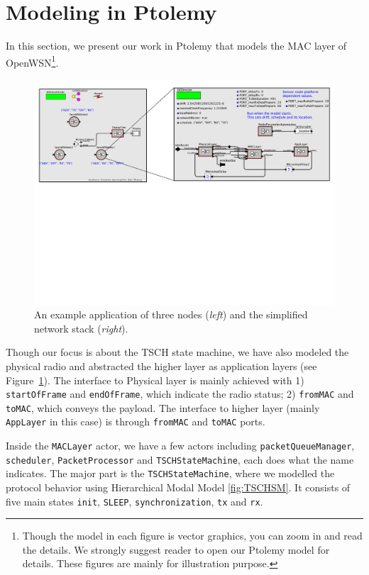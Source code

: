 
\section{Modeling in Ptolemy}
\label{sec:modeling-ptolemy}

In this section, we present our work in Ptolemy that models the MAC layer of OpenWSN\footnote{Though the model in each figure is vector graphics, you can zoom in and read the details. We strongly suggest reader to open our Ptolemy model for details. These figures are mainly for illustration purpose.}.

\begin{figure}[t]
\centering
\includegraphics[width=1\columnwidth]{figures/PaperOpenWSNNode}
\caption{An example application of three nodes ({\em left}) and the simplified network stack ({\em right}).}
\label{fig:OpenWSNNode}
\end{figure}

Though our focus is about the TSCH state machine, we have also modeled the physical radio and abstracted the higher layer as application layers (see Figure~\ref{fig:OpenWSNNode}). The interface to Physical layer is mainly achieved with 1) \texttt{startOfFrame} and \texttt{endOfFrame}, which indicate the radio status; 2) \texttt{fromMAC} and \texttt{toMAC}, which conveys the payload. The interface to higher layer (mainly \texttt{AppLayer} in this case) is through \texttt{fromMAC} and \texttt{toMAC} ports. 

Inside the \texttt{MACLayer} actor, we have a few actors including \texttt{packetQueueManager}, \texttt{scheduler}, \texttt{PacketProcessor} and \texttt{TSCHStateMachine}, each does what the name indicates. The major part is the \texttt{TSCHStateMachine}, where we modelled the protocol behavior using Hierarchical Modal Model \ref{fig:TSCHSM}. It consists of five main states \texttt{init}, \texttt{SLEEP}, \texttt{synchronization}, \texttt{tx} and \texttt{rx}. 


